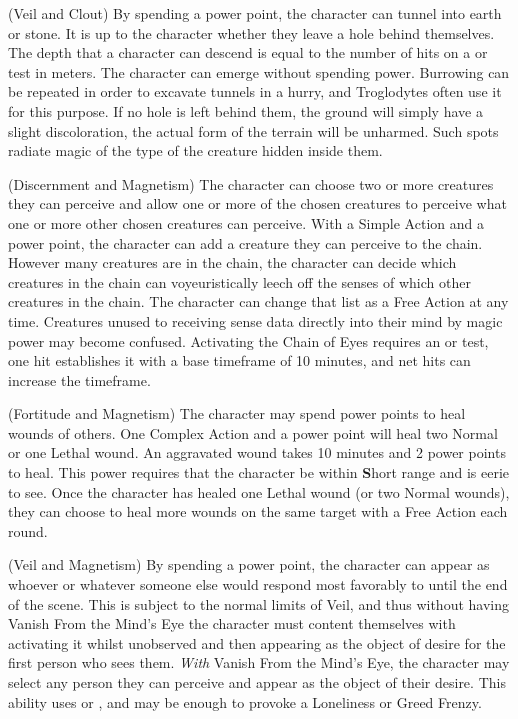  (Veil and Clout)
By spending a power point, the character can tunnel into earth or stone. It is up to the character whether they leave a hole behind themselves. The depth that a character can descend is equal to the number of hits on a  or  test in meters. The character can emerge without spending power. Burrowing can be repeated in order to excavate tunnels in a hurry, and Troglodytes often use it for this purpose. If no hole is left behind them, the ground will simply have a slight discoloration, the actual form of the terrain will be unharmed. Such spots radiate magic of the type of the creature hidden inside them.

 (Discernment and Magnetism)
The character can choose two or more creatures they can perceive and allow one or more of the chosen creatures to perceive what one or more other chosen creatures can perceive. With a Simple Action and a power point, the character can add a creature they can perceive to the chain. However many creatures are in the chain, the character can decide which creatures in the chain can voyeuristically leech off the senses of which other creatures in the chain. The character can change that list as a Free Action at any time. Creatures unused to receiving sense data directly into their mind by magic power may become confused. Activating the Chain of Eyes requires an  or  test, one hit establishes it with a base timeframe of 10 minutes, and net hits can increase the timeframe.

 (Fortitude and Magnetism)
The character may spend power points to heal wounds of others. One Complex Action and a power point will heal two Normal or one Lethal wound. An aggravated wound takes 10 minutes and 2 power points to heal. This power requires that the character be within \textbf{S}hort range and is eerie to see. Once the character has healed one Lethal wound (or two Normal wounds), they can choose to  heal more wounds on the same target with a Free Action each round.

 (Veil and Magnetism)
By spending a power point, the character can appear as whoever or whatever someone else would respond most favorably to until the end of the scene. This is subject to the normal limits of Veil, and thus without having Vanish From the Mind's Eye the character must content themselves with activating it whilst unobserved and then appearing as the object of desire for the first person who sees them. \textit{With} Vanish From the Mind's Eye, the character may select any person they can perceive and appear as the object of their desire. This ability uses  or , and may be enough to provoke a Loneliness or Greed Frenzy.

